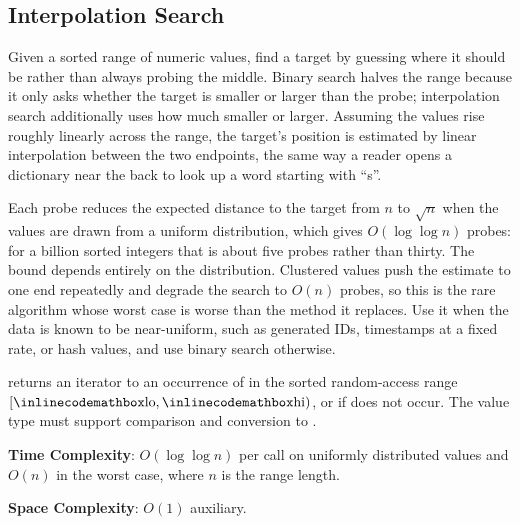 \subsection{Interpolation Search}
\label{sec:5.1.3}
Given a sorted range of numeric values, find a target by guessing where it should be rather than always probing the middle. Binary search halves the range because it only asks whether the target is smaller or larger than the probe; interpolation search additionally uses how much smaller or larger. Assuming the values rise roughly linearly across the range, the target's position is estimated by linear interpolation between the two endpoints, the same way a reader opens a dictionary near the back to look up a word starting with ``s''.

Each probe reduces the expected distance to the target from $n$ to $\sqrt{n}$ when the values are drawn from a uniform distribution, which gives $O(\log \log n)$ probes: for a billion sorted integers that is about five probes rather than thirty. The bound depends entirely on the distribution. Clustered values push the estimate to one end repeatedly and degrade the search to $O(n)$ probes, so this is the rare algorithm whose worst case is worse than the method it replaces. Use it when the data is known to be near-uniform, such as generated IDs, timestamps at a fixed rate, or hash values, and use binary search otherwise.

\begin{compactitem}
  \item {} returns an iterator to an occurrence of  in the sorted random-access range $[{\inlinecodemath{lo}}, {\inlinecodemath{hi}})$, or  if  does not occur. The value type must support comparison and conversion to .
\end{compactitem}

\textbf{Time Complexity}: $O(\log \log n)$ per call on uniformly distributed values and $O(n)$ in the worst case, where $n$ is the range length.

\textbf{Space Complexity}: $O(1)$ auxiliary.


